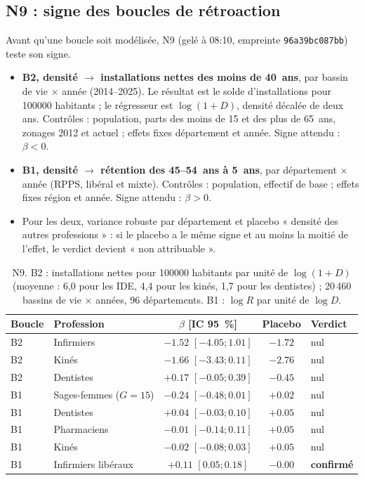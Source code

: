 \documentclass[11pt]{article}
\begin{document}
\subsection{N9 : signe des boucles de rétroaction}
Avant qu'une boucle soit modélisée, N9 (gelé à 08:10, empreinte \texttt{96a39bc087bb}) teste son signe.
\begin{itemize}
  \item \textbf{B2, densité $\to$ installations nettes des moins de 40~ans}, par bassin de vie $\times$
        année (2014--2025). Le résultat est le solde d'installations pour \num{100000} habitants ; le
        régresseur est $\log(1 + D)$, densité décalée de deux ans. Contrôles : population, parts des
        moins de 15 et des plus de 65~ans, zonages 2012 et actuel ; effets fixes département et
        année. Signe attendu : $\beta < 0$.
  \item \textbf{B1, densité $\to$ rétention des 45--54~ans à 5~ans}, par département $\times$ année
        (RPPS, libéral et mixte). Contrôles : population, effectif de base ; effets fixes région et
        année. Signe attendu : $\beta > 0$.
  \item Pour les deux, variance robuste par département et placebo « densité des autres
        professions » : si le placebo a le même signe et au moins la moitié de l'effet, le verdict
        devient « non attribuable ».
\end{itemize}

\begin{table}[h]
\centering\small
\begin{tabular}{@{}llccl@{}}
\toprule
Boucle & Profession & $\beta$ [IC 95~\%] & Placebo & Verdict \\
\midrule
B2 & Infirmiers & $\num{-1.52}$ $[\num{-4.05} ; \num{1.01}]$ & $\num{-1.72}$ & nul \\
B2 & Kinés & $\num{-1.66}$ $[\num{-3.43} ; \num{0.11}]$ & $\num{-2.76}$ & nul \\
B2 & Dentistes & $+\num{0.17}$ $[\num{-0.05} ; \num{0.39}]$ & $\num{-0.45}$ & nul \\
B1 & Sages-femmes ($G = 15$) & $\num{-0.24}$ $[\num{-0.48} ; \num{0.01}]$ & $+\num{0.02}$ & nul \\
B1 & Dentistes & $+\num{0.04}$ $[\num{-0.03} ; \num{0.10}]$ & $+\num{0.05}$ & nul \\
B1 & Pharmaciens & $\num{-0.01}$ $[\num{-0.14} ; \num{0.11}]$ & $+\num{0.05}$ & nul \\
B1 & Kinés & $\num{-0.02}$ $[\num{-0.08} ; \num{0.03}]$ & $+\num{0.05}$ & nul \\
B1 & Infirmiers libéraux & $+\num{0.11}$ $[\num{0.05} ; \num{0.18}]$ & $\num{-0.00}$ & \textbf{confirmé} \\
\bottomrule
\end{tabular}
\caption{N9. B2 : installations nettes pour \num{100000} habitants par unité de $\log(1+D)$ (moyenne :
6,0 pour les IDE, 4,4 pour les kinés, 1,7 pour les dentistes) ; 20\,460 bassins de vie $\times$
années, 96 départements. B1 : $\log R$ par unité de $\log D$.\mesure{}}\label{tab:n9}
\end{table}
\end{document}
